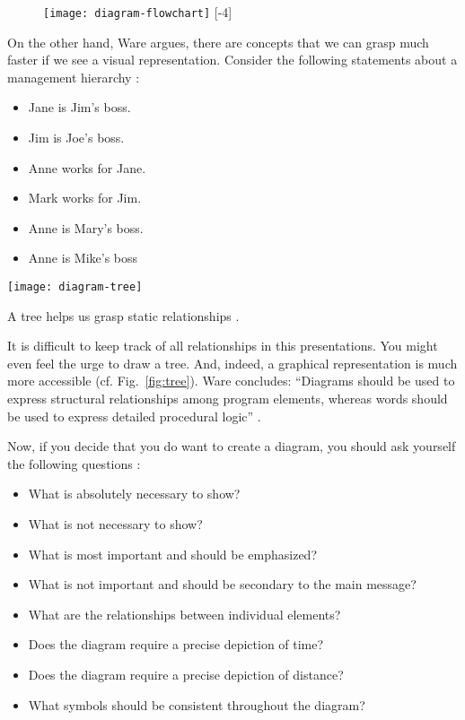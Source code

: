 \begin{figure}[t]
\centering
\texttt{[image: diagram-flowchart]}
[-4\baselineskip]
\end{figure}

On the other hand, Ware argues, there are concepts that we can grasp much faster if we see a visual representation. Consider the following statements about a management hierarchy \cite{Ware12}:

\begin{itemize}
  \item Jane is Jim’s boss.
  \item Jim is Joe’s boss.
  \item Anne works for Jane.
  \item Mark works for Jim.
  \item Anne is Mary’s boss.
  \item Anne is Mike’s boss
\end{itemize}


\begin{marginfigure}
\centering
\texttt{[image: diagram-tree]}
\caption{\label{fig:tree} A tree helps us grasp static relationships \cite{Ware12}.}%
\end{marginfigure}

It is difficult to keep track of all relationships in this presentations. You might even feel the urge to draw a tree. And, indeed, a graphical representation is much more accessible (cf. Fig.~\ref{fig:tree}). Ware concludes: ``Diagrams should be used to express structural relationships among program elements, whereas words should be used to express detailed procedural logic'' \cite{Ware12}.


Now, if you decide that you do want to create a diagram, you should ask yourself the following questions \cite{Carter12}:
\begin{itemize}
\item What is absolutely necessary to show?
\item What is not necessary to show?
\item What is most important and should be emphasized?
\item What is not important and should be secondary to the main message?
\item What are the relationships between individual elements?
\item Does the diagram require a precise depiction of time?
\item Does the diagram require a precise depiction of distance?
\item What symbols should be consistent throughout the diagram?
\end{itemize}


